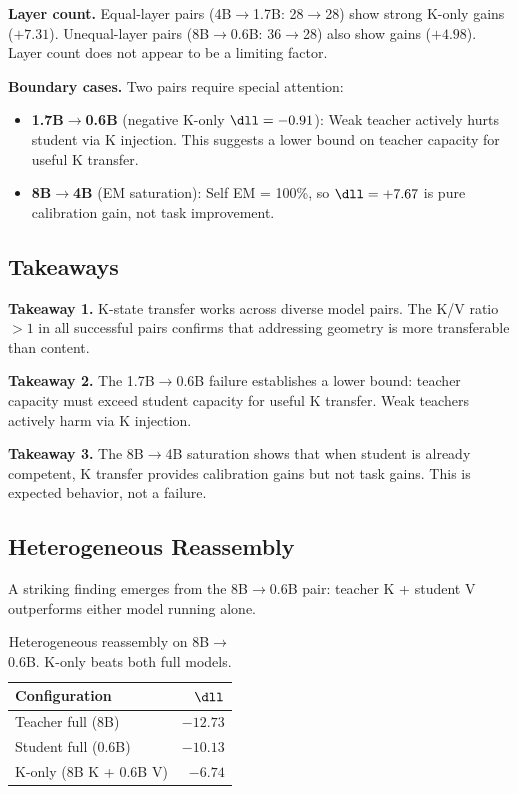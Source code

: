 \textbf{Layer count.}
Equal-layer pairs (4B$\to$1.7B: 28$\to$28) show strong K-only gains ($+7.31$).
Unequal-layer pairs (8B$\to$0.6B: 36$\to$28) also show gains ($+4.98$).
Layer count does not appear to be a limiting factor.

\textbf{Boundary cases.}
Two pairs require special attention:
\begin{itemize}
  \item \textbf{1.7B$\to$0.6B} (negative K-only $\dll = -0.91$): Weak teacher
    actively hurts student via K injection. This suggests a lower bound on
    teacher capacity for useful K transfer.
  \item \textbf{8B$\to$4B} (EM saturation): Self EM = 100\%, so $\dll = +7.67$
    is pure calibration gain, not task improvement.
\end{itemize}

\subsection{Takeaways}

\textbf{Takeaway 1.}
K-state transfer works across diverse model pairs.
The K/V ratio $> 1$ in all successful pairs confirms that
addressing geometry is more transferable than content.

\textbf{Takeaway 2.}
The 1.7B$\to$0.6B failure establishes a lower bound:
teacher capacity must exceed student capacity for useful K transfer.
Weak teachers actively harm via K injection.

\textbf{Takeaway 3.}
The 8B$\to$4B saturation shows that when student is already competent,
K transfer provides calibration gains but not task gains.
This is expected behavior, not a failure.

\subsection{Heterogeneous Reassembly}

A striking finding emerges from the 8B$\to$0.6B pair:
teacher K + student V outperforms either model running alone.

\begin{table}[t]
\centering
\caption{Heterogeneous reassembly on 8B$\to$0.6B.
K-only beats both full models.}
\label{tab:reassembly}
\begin{tabular}{lr}
\toprule
Configuration & $\dll$ \\
\midrule
Teacher full (8B) & $-12.73$ \\
Student full (0.6B) & $-10.13$ \\
K-only (8B K + 0.6B V) & $-6.74$ \\
\bottomrule
\end{tabular}
\end{table}

